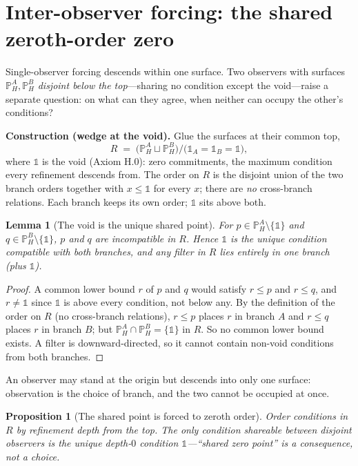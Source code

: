 \documentclass[11pt]{article}
\newtheorem{proposition}{Proposition}
\newtheorem{lemma}{Lemma}
\theoremstyle{definition}
\theoremstyle{remark}
\newcommand{\PH}{\mathbb{P}_{H}}
\newcommand{\refines}{\leq}
\begin{document}
\section{Inter-observer forcing: the shared zeroth-order zero}\label{sec:void}

Single-observer forcing descends within one surface. Two observers with surfaces $\PH^A,\PH^B$
\emph{disjoint below the top}---sharing no condition except the void---raise a separate question: on
what can they agree, when neither can occupy the other's conditions?

\medskip\noindent\textbf{Construction (wedge at the void).} Glue the surfaces at their common top,
\[
  R \;=\; \bigl(\PH^A \sqcup \PH^B\bigr)\big/\bigl(\mathbb{1}_A=\mathbb{1}_B=\mathbb{1}\bigr),
\]
where $\mathbb{1}$ is the void (Axiom H.0): zero commitments, the maximum condition every refinement
descends from. The order on $R$ is the disjoint union of the two branch orders together with
$x\refines\mathbb{1}$ for every $x$; there are \emph{no} cross-branch relations. Each branch keeps
its own order; $\mathbb{1}$ sits above both.

\begin{lemma}[The void is the unique shared point]\label{lem:void}
For $p\in\PH^A\setminus\{\mathbb{1}\}$ and $q\in\PH^B\setminus\{\mathbb{1}\}$, $p$ and $q$ are
incompatible in $R$. Hence $\mathbb{1}$ is the unique condition compatible with both branches, and
any filter in $R$ lies entirely in one branch (plus $\mathbb{1}$).
\end{lemma}

\begin{proof}
A common lower bound $r$ of $p$ and $q$ would satisfy $r\refines p$ and $r\refines q$, and
$r\ne\mathbb{1}$ since $\mathbb{1}$ is above every condition, not below any. By the definition of
the order on $R$ (no cross-branch relations), $r\refines p$ places $r$ in branch $A$ and
$r\refines q$ places $r$ in branch $B$; but $\PH^A\cap\PH^B=\{\mathbb{1}\}$ in $R$. So no common
lower bound exists. A filter is downward-directed, so it cannot contain non-void conditions from
both branches.
\end{proof}

An observer may stand at the origin but descends into only one surface: observation is the choice of
branch, and the two cannot be occupied at once.

\begin{proposition}[The shared point is forced to zeroth order]\label{prop:zeroth}
Order conditions in $R$ by refinement depth from the top. The only condition shareable between
disjoint observers is the unique depth-$0$ condition $\mathbb{1}$---``shared zero point'' is a
consequence, not a choice.
\end{proposition}
\end{document}

